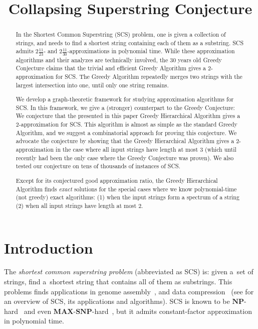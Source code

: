 \documentclass[11pt]{article}
\begin{document}
%

\sloppy
\date{}
\title{Collapsing Superstring Conjecture}
\author{}
\maketitle

\begin{abstract}
In the Shortest Common Superstring (SCS) problem, one is given a collection of strings, and needs to find a shortest string containing each of them as a substring. SCS admits $2\frac{11}{23}$- and $2\frac{11}{30}$-approximations in polynomial time. While these approximation algorithms and their analyzes are technically involved, the $30$ years old Greedy Conjecture claims that the trivial and efficient Greedy Algorithm gives a $2$-approximation for SCS. The Greedy Algorithm repeatedly merges two strings with the largest intersection into one, until only one string remains.

We develop a graph-theoretic framework for studying approximation algorithms for SCS. In this framework, we give a (stronger) counterpart to the Greedy Conjecture: We conjecture that the presented in this paper Greedy Hierarchical Algorithm gives a $2$-approximation for SCS. This algorithm is almost as simple as the standard Greedy Algorithm, and we suggest a combinatorial approach for proving this conjecture. We advocate the conjecture by showing that the Greedy Hierarchical Algorithm gives a $2$-approximation in the case where all input strings have length at most $3$ (which until recently had been the only case where the Greedy Conjecture was proven). We also tested our conjecture on tens of thousands of instances of SCS.

Except for its conjectured good approximation ratio, the Greedy Hierarchical Algorithm finds \emph{exact} solutions for the special cases where we know polynomial-time (not greedy) exact algorithms: (1) when the input strings form a spectrum of a string (2) when all input strings have length at most $2$.
\end{abstract}


\section{Introduction}
\label{sec:intro}
The {\em shortest common superstring problem} (abbreviated as SCS) is:
given a~set of strings, find a~shortest string that contains all of them as
substrings. This problems finds applications in genome assembly~\cite{waterman1995introduction, pevzner2001eulerian}, and data compression~\cite{GMS1980, phdthesis, storer1987data} (see \cite{gevezes2014shortest, mucha2007tutorial} for an overview of SCS, its applications and algorithms).  SCS is known to be $\mathbf{NP}$-hard~\cite{GMS1980} and even $\mathbf{MAX}$-$\mathbf{SNP}$-hard~\cite{BJLTY1991}, but it admits constant-factor approximation in polynomial time.
\end{document}
